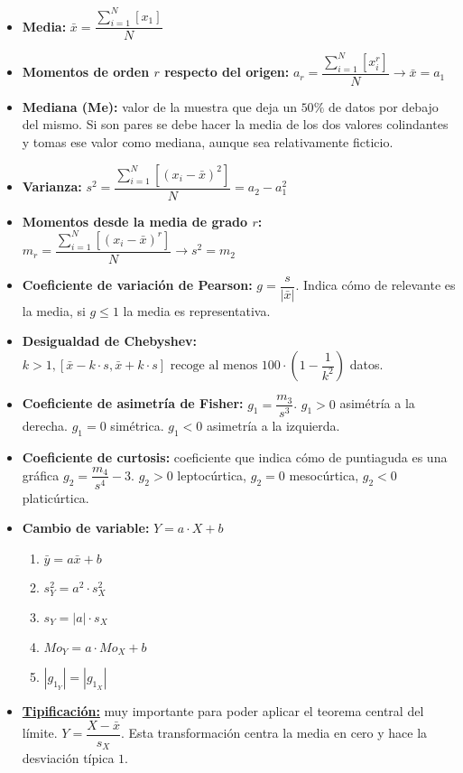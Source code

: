 \documentclass[a4paper, twocolumn, 10pt]{article}
\begin{document}
\begin{itemize}
	\item \textbf{Media:} $\bar{x} = \dfrac{\sum\limits_{i=1}^{N}\left[x_1\right]}{N}$
	\item \textbf{Momentos de orden $r$ respecto del origen:} $a_r = \dfrac{\sum\limits_{i=1}^{N}\left[x_i^r\right]}{N}
	\rightarrow \bar{x} = a_1$
	\item \textbf{Mediana (Me):} valor de la muestra que deja un $50\%$ de datos por debajo del mismo. Si son pares se debe hacer la media de los dos valores colindantes y tomas ese valor como mediana, aunque sea relativamente ficticio.
	\item \textbf{Varianza:} $s^2 = \dfrac{\sum\limits_{i=1}^{N}\left[\left(x_i - \bar{x}\right)^2\right]}{N} = a_2 - a_1^2$
	\item \textbf{Momentos desde la media de grado $r$:} $m_r = \dfrac{\sum\limits_{i=1}^{N}\left[\left(x_i - \bar{x}\right)^r\right]}{N} \rightarrow s^2 = m_2$
	\item \textbf{Coeficiente de variación de Pearson:} $g = \dfrac{s}{|\bar{x}|}$. Indica cómo de relevante es la media, si $g \leq 1$ la media es representativa.
	\item \textbf{Desigualdad de Chebyshev:} \\ $k>1,\left[\bar{x} -k\cdot s,\bar{x} +k\cdot s \right] \text{ recoge al menos } 100\cdot\left(1-\dfrac{1}{k^2}\right)$ datos.
	\item \textbf{Coeficiente de asimetría de Fisher:} $g_1 = \dfrac{m_3}{s^3}$. $g_1>0$ asimétría a la derecha. $g_1=0$ simétrica. $g_1<0$ asimetría a la izquierda.
	\item \textbf{Coeficiente de curtosis:} coeficiente que indica cómo de puntiaguda es una gráfica $g_2 = \dfrac{m_4}{s^4} - 3$. $g_2 > 0$ leptocúrtica, $g_2 = 0$ mesocúrtica, $g_2 < 0$ platicúrtica.
	\item \textbf{Cambio de variable:} $Y = a\cdot X + b$
	\begin{enumerate}
		\item $\bar{y} = a\bar{x} + b$
		\item $s_Y^2 = a^2 \cdot s_X^2$
		\item $s_Y = |a|\cdot s_X$
		\item $Mo_Y = a\cdot Mo_X + b$
		\item $|g_{1_Y}| = |g_{1_X}|$
	\end{enumerate}
	\item \textbf{\underline{Tipificación:}} muy importante para poder aplicar el teorema central del límite. $Y =  \dfrac{X-\bar{x}}{s_X}$. Esta transformación centra la media en cero y hace la desviación típica $1$.
\end{itemize}
\end{document}
